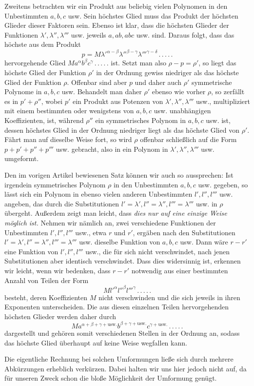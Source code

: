 Zweitens betrachten wir ein Produkt aus beliebig vielen Polynomen in den Unbestimmten $a,b,c$ usw. Sein höchstes Glied muss das Produkt der höchsten Glieder dieser Faktoren sein. Ebenso ist klar, dass die höchsten Glieder der Funktionen $\lambda',\lambda'',\lambda'''$ usw. jeweils $a,ab,abc$ usw. sind. Daraus folgt, dass das höchste aus dem Produkt
\[
p=M{\lambda'}^{\alpha-\beta}{\lambda''}^{\beta-\gamma}{\lambda'''}^{\gamma-\delta}\, .\, .\, .\, .\, .
\]
hervorgehende Glied $Ma^\alpha b^\beta c^\gamma\, .\, .\, .\, .\, .$ ist. Setzt man also $\rho-p=\rho'$, so liegt das höchste Glied der Funktion $\rho'$ in der Ordnung gewiss niedriger als das höchste Glied der Funktion $\rho$. Offenbar sind aber $p$ und daher auch $\rho'$ symmetrische Polynome in $a,b,c$ usw. Behandelt man daher $\rho'$ ebenso wie vorher $\rho$, so zerfällt es in $p'+\rho''$, wobei $p'$ ein Produkt aus Potenzen von $\lambda',\lambda'',\lambda'''$ usw., multipliziert mit einem bestimmten oder wenigstens von $a,b,c$ usw. unabhängigen Koeffizienten, ist, während $\rho''$ ein symmetrisches Polynom in $a,b,c$ usw. ist, dessen höchstes Glied in der Ordnung niedriger liegt als das höchste Glied von $\rho'$. Fährt man auf dieselbe Weise fort, so wird $\rho$ offenbar schließlich auf die Form $p+p'+p''+p'''$ usw. gebracht, also in ein Polynom in $\lambda',\lambda'',\lambda'''$ usw. umgeformt.

Den im vorigen Artikel bewiesenen Satz können wir auch so aussprechen: Ist irgendein symmetrisches Polynom $\rho$ in den Unbestimmten $a,b,c$ usw. gegeben, so lässt sich ein Polynom in ebenso vielen anderen Unbestimmten $l',l'',l'''$ usw. angeben, das durch die Substitutionen $l'=\lambda',l''=\lambda'',l'''=\lambda'''$ usw.
in $\rho$ übergeht. Außerdem zeigt man leicht, dass \textit{dies nur auf eine einzige Weise möglich ist.} Nehmen wir nämlich an, zwei verschiedene Funktionen der Unbestimmten $l',l'',l'''$ usw., etwa $r$ und $r'$, ergäben nach den Substitutionen $l'=\lambda',l''=\lambda'',l'''=\lambda'''$ usw. dieselbe Funktion von $a,b,c$ usw. Dann wäre $r-r'$ eine Funktion von $l',l'',l'''$ usw., die für sich nicht verschwindet, nach jenen Substitutionen aber identisch verschwindet. Dass dies widersinnig ist, erkennen wir leicht, wenn wir bedenken, dass $r-r'$ notwendig aus einer bestimmten Anzahl von Teilen der Form
\[
M{l'}^\alpha{l''}^\beta{l'''}^\gamma\, .\, .\, .\, .\, .
\]
besteht, deren Koeffizienten $M$ nicht verschwinden und die sich jeweils in ihren Exponenten unterscheiden. Die aus diesen einzelnen Teilen hervorgehenden höchsten Glieder werden daher durch
\[
Ma^{\alpha+\beta+\gamma+\text{usw.}}b^{\beta+\gamma+\text{usw.}}c^{\gamma+\text{usw.}}\, .\, .\, .\, .\, .
\]
dargestellt und gehören somit verschiedenen Stellen in der Ordnung an, sodass das höchste Glied überhaupt auf keine Weise wegfallen kann.

Die eigentliche Rechnung bei solchen Umformungen ließe sich durch mehrere Abkürzungen erheblich verkürzen. Dabei halten wir uns hier jedoch nicht auf, da für unseren Zweck schon die bloße Möglichkeit der Umformung genügt.
